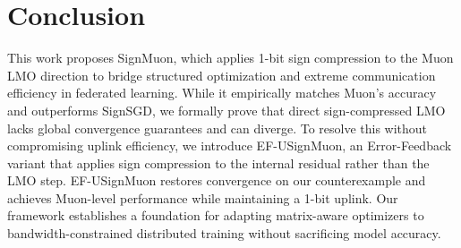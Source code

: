 \documentclass{article}
\begin{document}
\section{Conclusion}\label{sec:conclusion}



This work proposes SignMuon, which applies 1-bit sign compression to the Muon LMO direction to bridge structured optimization and extreme communication efficiency in federated learning. While it empirically matches Muon's accuracy and outperforms SignSGD, we formally prove that direct sign-compressed LMO lacks global convergence guarantees and can diverge. To resolve this without compromising uplink efficiency, we introduce EF-USignMuon, an Error-Feedback variant that applies sign compression to the internal residual rather than the LMO step. EF-USignMuon restores convergence on our counterexample and achieves Muon-level performance while maintaining a 1-bit uplink. Our framework establishes a foundation for adapting matrix-aware optimizers to bandwidth-constrained distributed training without sacrificing model accuracy.
\end{document}
